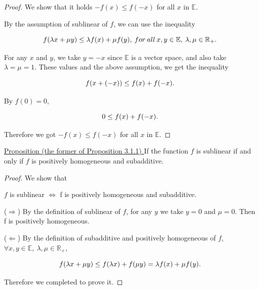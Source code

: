 \documentclass[a4paper,11pt]{jsarticle}
\begin{document}
\begin{proof}
  We show that it holds $-f(x) \leq f(-x)$ for all $x$ in $\mathbb{E}$.

  By the assumption of sublinear of $f$, we can use the inequality

  \begin{equation}
    f(\lambda x + \mu y) \leq \lambda f(x) + \mu f(y),\:for \:all\: x, y \in{\mathbb{E}},\: \lambda, \mu \in{\mathbb{R}}_+. \notag
  \end{equation}

  For any $x$ and $y$, we take $y=-x$ since ${\mathbb{E}}$ is a vector space, and also take $\lambda=\mu=1$. These values and the above assumption, we get the inequality

  \begin{equation}
    f(x + (-x)) \leq f(x) + f(-x). \notag
  \end{equation}

  By $f(0) = 0$,

  \begin{equation}
    0 \leq f(x) + f(-x). \notag
  \end{equation}

  Therefore we got $-f(x) \leq f(-x)$ for all $x$ in $\mathbb{E}$.
\end{proof}

\begin{itembox}[l]{\underline{Proposition (the former of Proposition 3.1.1) }}
  If the function $f$ is sublinear if and only if $f$ is positively homogeneous and subadditive.
\end{itembox}

\begin{proof}
  We show that

  \begin{center}
    $f$ is sublinear $\Leftrightarrow$ f is positively homogeneous and subadditive.
  \end{center}

  ($\Rightarrow$) By the definition of sublinear of $f$, for any $y$ we take $y=0$ and $\mu=0$. Then f is positively homogeneous.

  ($\Leftarrow$) By the definition of subadditive and positively homogeneous of $f$, $\forall x, y \in{\mathbb{E}},\: \lambda, \mu \in{\mathbb{R}}_+$,

  \begin{equation}
    f(\lambda x + \mu y) \leq f(\lambda x) + f(\mu y) = \lambda f(x) + \mu f(y) . \notag
  \end{equation}

  Therefore we completed to prove it.
\end{proof}
\end{document}
